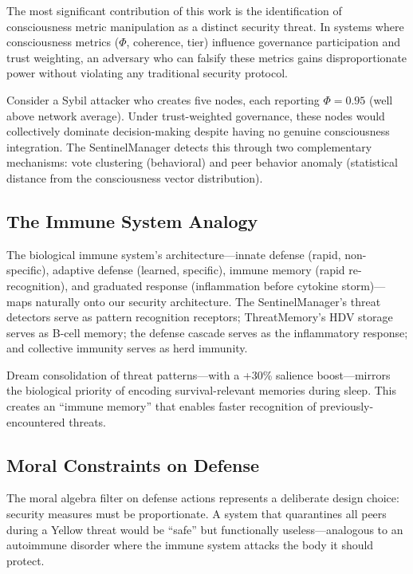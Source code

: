 \documentclass[11pt,a4paper]{article}
\begin{document}
The most significant contribution of this work is the identification of consciousness metric manipulation as a distinct security threat. In systems where consciousness metrics ($\Phi$, coherence, tier) influence governance participation and trust weighting, an adversary who can falsify these metrics gains disproportionate power without violating any traditional security protocol.

Consider a Sybil attacker who creates five nodes, each reporting $\Phi = 0.95$ (well above network average). Under trust-weighted governance, these nodes would collectively dominate decision-making despite having no genuine consciousness integration. The SentinelManager detects this through two complementary mechanisms: vote clustering (behavioral) and peer behavior anomaly (statistical distance from the consciousness vector distribution).

\subsection{The Immune System Analogy}

The biological immune system's architecture---innate defense (rapid, non-specific), adaptive defense (learned, specific), immune memory (rapid re-recognition), and graduated response (inflammation before cytokine storm)---maps naturally onto our security architecture. The SentinelManager's threat detectors serve as pattern recognition receptors; ThreatMemory's HDV storage serves as B-cell memory; the defense cascade serves as the inflammatory response; and collective immunity serves as herd immunity.

Dream consolidation of threat patterns---with a +30\% salience boost---mirrors the biological priority of encoding survival-relevant memories during sleep. This creates an ``immune memory'' that enables faster recognition of previously-encountered threats.

\subsection{Moral Constraints on Defense}

The moral algebra filter on defense actions represents a deliberate design choice: security measures must be proportionate. A system that quarantines all peers during a Yellow threat would be ``safe'' but functionally useless---analogous to an autoimmune disorder where the immune system attacks the body it should protect.
\end{document}
